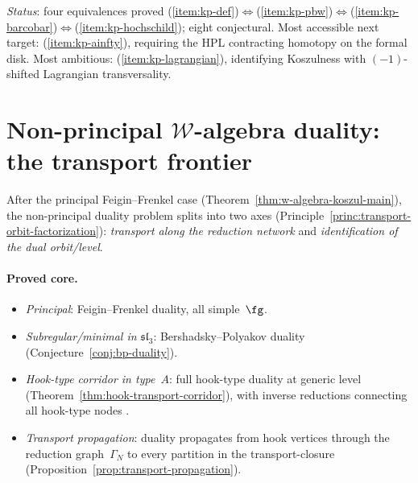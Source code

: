 \noindent
\emph{Status}: four equivalences proved
(\ref{item:kp-def})$\Leftrightarrow$(\ref{item:kp-pbw})$\Leftrightarrow$(\ref{item:kp-barcobar})$\Leftrightarrow$(\ref{item:kp-hochschild});
eight conjectural.  Most accessible next target:
(\ref{item:kp-ainfty}), requiring the HPL contracting
homotopy on the formal disk.  Most ambitious:
(\ref{item:kp-lagrangian}), identifying Koszulness with
$(-1)$-shifted Lagrangian transversality.


\section{Non-principal \texorpdfstring{$\mathcal{W}$}{W}-algebra
duality: the transport frontier}
\label{sec:concordance-non-principal-w}

After the principal Feigin--Frenkel case
(Theorem~\ref{thm:w-algebra-koszul-main}), the non-principal
duality problem splits into two axes
(Principle~\ref{princ:transport-orbit-factorization}):
\emph{transport along the reduction network} and
\emph{identification of the dual orbit/level}.

\paragraph{Proved core.}
\begin{itemize}
\item \emph{Principal}: Feigin--Frenkel duality, all simple~$\fg$.
\item \emph{Subregular/minimal in $\mathfrak{sl}_3$}:
  Bershadsky--Polyakov duality (Conjecture~\ref{conj:bp-duality}).
\item \emph{Hook-type corridor in type~$A$}:
  full hook-type duality at generic level
  (Theorem~\ref{thm:hook-transport-corridor}), with inverse
  reductions connecting all hook-type nodes
  \cite{FehilyHook,CLNS24,CFLN24,GenraStages,ButsonNair}.
\item \emph{Transport propagation}: duality propagates from hook
  vertices through the reduction graph~$\Gamma_N$ to every
  partition in the transport-closure
  (Proposition~\ref{prop:transport-propagation}).
\end{itemize}

